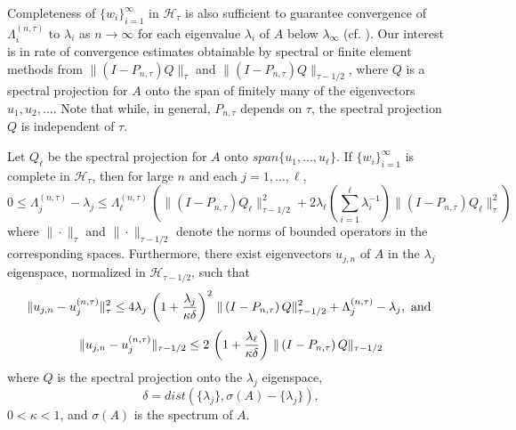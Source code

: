 \documentclass[final]{siamltex}
\numberwithin{equation}{section}
\begin{document}
Completeness of $\{w_i\}_{i=1}^{\infty}$ in
$\mathcal{H}_{\tau}$ is also sufficient to guarantee convergence
of $\Lambda_{i}^{(n,\tau)}$ to $\lambda_i$ as $n\to \infty$ for
each eigenvalue $\lambda_i$ of $A$ below $\lambda_{\infty}$
(cf. \cite{Weinberger-SIAM}). Our interest is in
rate of convergence estimates obtainable by spectral or finite
element methods from $\| \left(I-P_{n,\tau}\right) Q\|_{\tau}$ and
$\| \left(I-P_{n,\tau}\right) Q\|_{\tau-1/2}$, where $Q$ is a
spectral projection for $A$ onto the span of finitely many of the
eigenvectors $u_1, u_2, \ldots$. Note that while, in general,
$P_{n, \tau}$ depends on $\tau$, the spectral projection $Q$ is
independent of $\tau$.

\begin{theorem} \label{theo3.1} Let $Q_{\ell}$ be the
spectral projection for $A$ onto $span \{u_1, \ldots, u_{\ell} \}$. If
$\{w_i\}_{i=1}^{\infty}$ is complete in $\mathcal{H}_{\tau}$, then
for large $n$ and each $j=1, \ldots, \ell$, {\small
\[0 \le \Lambda_{j}^{(n,\tau)} - \lambda_j \le
\Lambda_{\ell}^{(n,\tau)} \, \left( \| \left(I-P_{n,\tau}\right)
Q_{\ell}\|_{\tau-1/2}^2+ 2 \lambda_{\ell} \left( \sum_{i=1}^{\ell}
\lambda_i^{-1} \right)  \| \left(I-P_{n,\tau}\right)
Q_{\ell}\|_{\tau}^2 \right)\] }where $\| \cdot \|_{\tau}$ and  $\| \cdot
\|_{\tau-1/2}$ denote the norms of bounded operators in the
corresponding spaces. Furthermore, there exist eigenvectors
$u_{j,n}$ of $A$ in the $\lambda_j$ eigenspace, normalized in
$\mathcal{H}_{\tau-1/2}$, such that \begin{equation} \notag
\|
u_{j,n}-u_{j}^{(n,\tau)}\|_{\tau}^2 \le 4 \lambda_j \, \left(1+
\frac{\lambda_j}{\kappa \delta}\right)^2 \, \|
\left(I-P_{n,\tau}\right) Q\|_{\tau-1/2}^2+ \Lambda_{j}^{(n,\tau)}
- \lambda_j, \text{ and }
\end{equation}
\begin{equation} \notag
\|
u_{j,n}-u_{j}^{(n,\tau)}\|_{\tau-1/2} \le 2 \, \left(1+
\frac{\lambda_{\ell}}{\kappa \delta}\right) \, \|
\left(I-P_{n,\tau}\right) Q\|_{\tau-1/2}
\end{equation}
where $Q$ is the spectral projection onto the $\lambda_j$
eigenspace, \[\delta=dist (\{\lambda_j\}, \sigma(A)-
\{\lambda_j\}),\] $0<\kappa<1$, and $\sigma(A)$ is the spectrum of
$A$.
\end{theorem}
\end{document}
